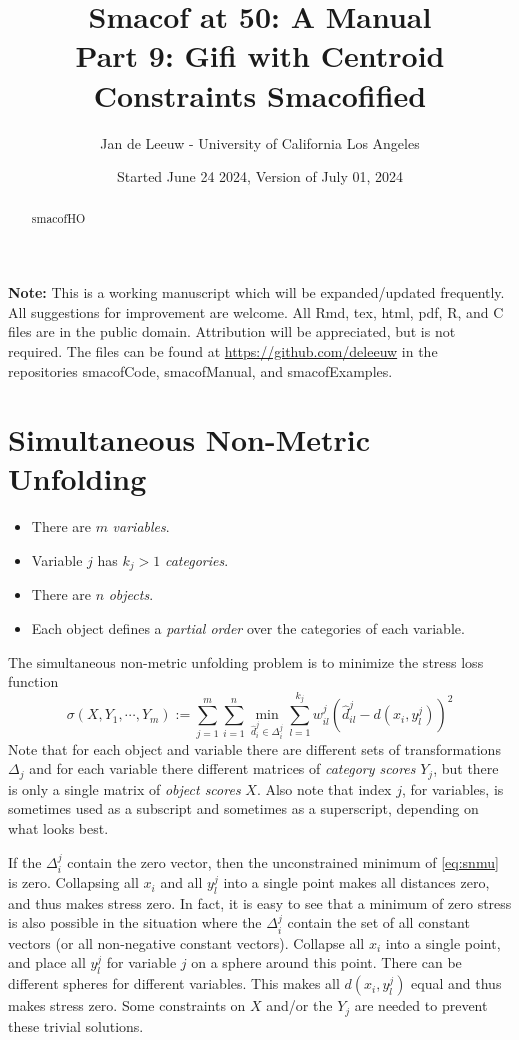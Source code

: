 \documentclass[
  12pt,
]{article}
\title{Smacof at 50: A Manual\\
Part 9: Gifi with Centroid Constraints Smacofified}
\author{Jan de Leeuw - University of California Los Angeles}
\date{Started June 24 2024, Version of July 01, 2024}
\providecommand{\tightlist}{%
  \setlength{\itemsep}{0pt}\setlength{\parskip}{0pt}}
\begin{document}
\maketitle
\begin{abstract}
smacofHO
\end{abstract}

{
\setcounter{tocdepth}{3}
\tableofcontents
}
\textbf{Note:} This is a working manuscript which will be expanded/updated
frequently. All suggestions for improvement are welcome. All Rmd, tex,
html, pdf, R, and C files are in the public domain. Attribution will be
appreciated, but is not required. The files can be found at
\url{https://github.com/deleeuw} in the repositories smacofCode, smacofManual,
and smacofExamples.

\section{Simultaneous Non-Metric Unfolding}\label{snmu}

\begin{itemize}
\tightlist
\item
  There are \(m\) \emph{variables}.
\item
  Variable \(j\) has \(k_j>1\) \emph{categories}.
\item
  There are \(n\) \emph{objects}.
\item
  Each object defines a \emph{partial order} over the categories of each variable.
\end{itemize}

The simultaneous non-metric unfolding problem is to minimize the stress loss function
\begin{equation}
\sigma(X,Y_1,\cdots,Y_m):=\sum_{j=1}^m\sum_{i=1}^n\min_{\hat d_i^j\in\Delta_i^j}\sum_{l=1}^{k_j}w_{il}^j(\hat d_{il}^j-d(x_i,y_l^j))^2
\label{eq:snmu}
\end{equation}
Note that for each object and variable there are different sets of transformations \(\Delta_j\)
and for each variable there different matrices of \emph{category scores} \(Y_j\), but there is only a single matrix of \emph{object scores} \(X\). Also note that index \(j\), for variables, is sometimes used as a subscript and sometimes as a superscript, depending on what looks best.

If the \(\Delta_i^j\) contain the zero vector, then the unconstrained minimum of \eqref{eq:snmu} is zero. Collapsing all \(x_i\) and all \(y_l^j\) into a single point makes all distances zero, and thus makes stress zero. In fact, it is easy to see that a minimum of zero stress is also possible in the situation where the \(\Delta_i^j\) contain the set of all constant vectors (or all non-negative constant vectors). Collapse all
\(x_i\) into a single point, and place all \(y_l^j\) for variable \(j\) on a sphere around this point. There can be different spheres for different variables. This makes all \(d(x_i,y_l^j)\) equal and thus makes stress zero. Some constraints on \(X\) and/or the \(Y_j\) are needed to prevent these trivial solutions.
\end{document}
